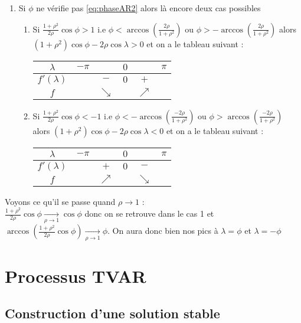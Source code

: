 \documentclass{report}
\begin{document}
\begin{Ex}[Cas où p=2 à racines complexes conjuguées]
\begin{enumerate}
\begin{center}
\end{center}
\item Si $\phi$ ne vérifie pas \eqref{eq:phaseAR2} alors là encore deux cas possibles
\begin{enumerate}
\item Si $\frac{1+\rho^2}{2\rho} \cos{\phi} > 1$ i.e $\phi < \arccos\left( \frac{2\rho}{1+\rho^2} \right)$ ou $\phi > -\arccos\left( \frac{2\rho}{1+\rho^2} \right)$ alors $(1+\rho^2)\cos{\phi} - 2\rho \cos{\lambda} >0$ et on a le tableau suivant :
\begin{center}
\begin{tabular}{c|ccccc}
$\lambda$ & $-\pi$ & & $0$ & & $\pi$  \\
\hline
$f'(\lambda)$ & & $-$ & $0$ & $+$ & \\
\hline
$f$ & & $\searrow$ & & $\nearrow$ & \\
\end{tabular}
\end{center}
\item Si $\frac{1+\rho^2}{2\rho} \cos{\phi} < -1$ i.e $\phi < -\arccos\left( \frac{-2\rho}{1+\rho^2} \right)$ ou $\phi > \arccos\left( \frac{-2\rho}{1+\rho^2} \right)$ alors $(1+\rho^2)\cos{\phi} - 2\rho \cos{\lambda} <0$ et on a le tableau suivant :
\begin{center}
\begin{tabular}{c|ccccc}
$\lambda$ & $-\pi$ & & $0$ & & $\pi$  \\
\hline
$f'(\lambda)$ & & $+$ & $0$ & $-$ & \\
\hline
$f$ & & $\nearrow$ & & $\searrow$ & \\
\end{tabular}
\end{center}
\end{enumerate}
\end{enumerate}
Voyons ce qu'il se passe quand $\rho \to 1$ : \\
$\frac{1+\rho^2}{2\rho} \cos{\phi}  \xrightarrow[\rho \to 1]{} \cos{\phi}$ donc on se retrouve dans le cas 1 et $\arccos\left(\frac{1+\rho^2}{2\rho} \cos{\phi}\right) \xrightarrow[\rho \to 1]{} \phi$. On aura donc bien nos pics à $\lambda = \phi$ et $\lambda = -\phi$
\end{Ex}
\chapter{Processus TVAR}\label{chap:TVAR}
\section{Construction d'une solution stable}
\end{document}
